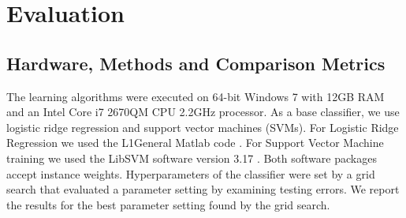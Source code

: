 \documentclass[conference]{IEEEtran}
\begin{document}
%
%
%
%
%
\section{Evaluation}

\subsection{Hardware, Methods and Comparison Metrics}
The learning algorithms were executed on 64-bit Windows 7 with 12GB RAM and an Intel Core i7 2670QM CPU 2.2GHz processor. As a base classifier, we use logistic ridge regression and support vector machines (SVMs). For Logistic Ridge Regression we used the L1General Matlab code \cite{bib:l1general}. For Support Vector Machine training we used the LibSVM software version 3.17 \cite{Chang2011}. Both software packages accept instance weights. Hyperparameters of the classifier were set by a grid search that evaluated a parameter setting by examining testing errors. We report the results for the best parameter setting found by the grid search.
\end{document}
